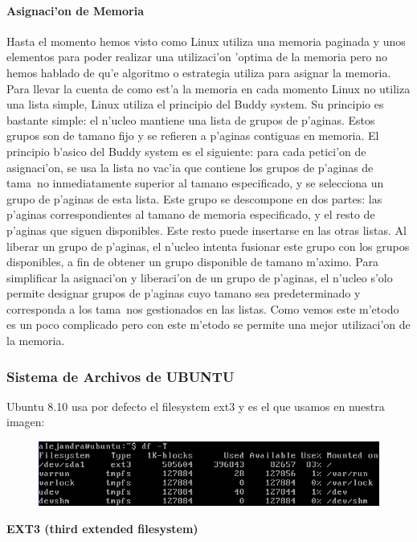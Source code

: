 \paragraph{Asignaci'on de Memoria}
Hasta el momento hemos visto como Linux utiliza una memoria paginada y unos elementos para poder realizar una utilizaci'on 'optima de la memoria pero no hemos hablado de qu'e algoritmo o estrategia utiliza para asignar la memoria. Para llevar la cuenta de como est'a la memoria en cada momento Linux no utiliza una lista simple, Linux utiliza el principio del Buddy system. Su principio es bastante simple: el n'ucleo mantiene una lista de grupos de p'aginas. Estos grupos son de tamano fijo y se refieren a p'aginas contiguas en memoria.
El principio b'asico del Buddy system es el siguiente: para cada petici'on de asignaci'on, se usa la lista no vac'ia que contiene los grupos de p'aginas de tama~no inmediatamente superior al tamano especificado, y se selecciona un grupo de p'aginas de esta lista. Este grupo se descompone en dos partes: las p'aginas correspondientes al tamano de memoria especificado, y el resto de p'aginas que siguen disponibles. Este resto puede insertarse en las otras listas.
Al liberar un grupo de p'aginas, el n'ucleo intenta fusionar este grupo con los grupos disponibles, a fin de obtener un grupo disponible de tamano m'aximo.
Para simplificar la asignaci'on y liberaci'on de un grupo de p'aginas, el n'ucleo s'olo permite designar grupos de p'aginas cuyo tamano sea predeterminado y corresponda a los tama~nos gestionados en las listas.
Como vemos este m'etodo es un poco complicado pero con este m'etodo se permite una mejor utilizaci'on de la memoria.

\subsubsection{Sistema de Archivos de UBUNTU}
Ubuntu 8.10 usa por defecto el filesystem ext3 y es el que usamos en nuestra imagen:		
\begin{figure}[h]
\centering
\includegraphics[scale=0.5]{versionUsadaDeFS.png}
\end{figure}
\textbf{EXT3 (third extended filesystem)}

